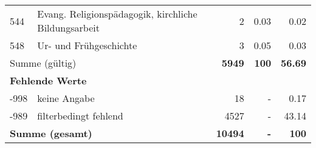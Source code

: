 \begin{longtable}{lXrrr}
        544 & \multicolumn{1}{X}{Evang. Religionspädagogik, kirchliche Bildungsarbeit} & %
          \num{2} &
          \num[round-mode=places,round-precision=2]{0.03} &
          \num[round-mode=places,round-precision=2]{0.02} \\

        548 & \multicolumn{1}{X}{Ur- und Frühgeschichte} & %
          \num{3} &
          \num[round-mode=places,round-precision=2]{0.05} &
          \num[round-mode=places,round-precision=2]{0.03} \\

     \midrule
     \multicolumn{2}{l}{Summe (gültig)} &
       \textbf{\num{5949}} &
     \textbf{\num{100}} &
       \textbf{\num[round-mode=places,round-precision=2]{56.69}} \\
     \multicolumn{5}{l}{\textbf{Fehlende Werte}}\\
       -998 &
       keine Angabe &
         \num{18} &
        - &
         \num[round-mode=places,round-precision=2]{0.17} \\
       -989 &
       filterbedingt fehlend &
         \num{4527} &
        - &
         \num[round-mode=places,round-precision=2]{43.14} \\
     \midrule
     \multicolumn{2}{l}{\textbf{Summe (gesamt)}} &
          \textbf{\num{10494}} &
        \textbf{-} &
        \textbf{\num{100}} \\
     \bottomrule
     \end{longtable}
     
